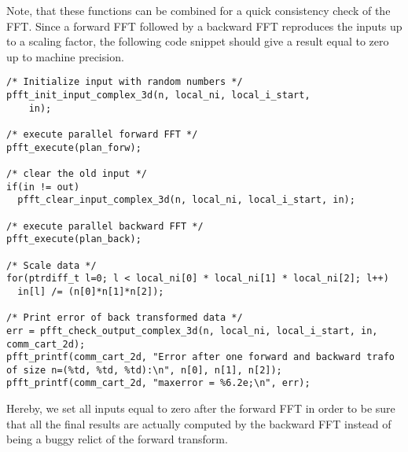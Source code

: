 Note, that these functions can be combined for a quick consistency check of the FFT.
Since a forward FFT followed by a backward FFT reproduces the inputs up to a scaling factor,
the following code snippet should give a result equal to zero up to machine precision.
\begin{lstlisting}
/* Initialize input with random numbers */
pfft_init_input_complex_3d(n, local_ni, local_i_start,
    in);

/* execute parallel forward FFT */
pfft_execute(plan_forw);

/* clear the old input */
if(in != out) 
  pfft_clear_input_complex_3d(n, local_ni, local_i_start, in);

/* execute parallel backward FFT */
pfft_execute(plan_back);

/* Scale data */
for(ptrdiff_t l=0; l < local_ni[0] * local_ni[1] * local_ni[2]; l++)
  in[l] /= (n[0]*n[1]*n[2]);

/* Print error of back transformed data */
err = pfft_check_output_complex_3d(n, local_ni, local_i_start, in, comm_cart_2d);
pfft_printf(comm_cart_2d, "Error after one forward and backward trafo of size n=(%td, %td, %td):\n", n[0], n[1], n[2]);
pfft_printf(comm_cart_2d, "maxerror = %6.2e;\n", err);
\end{lstlisting}
Hereby, we set all inputs equal to zero after the forward FFT in order to be sure that all the final results are actually computed by the backward FFT instead of being a buggy relict of the forward transform.


